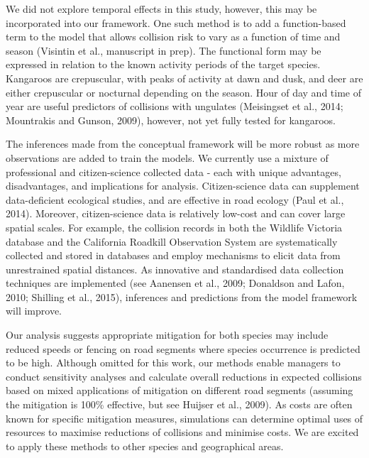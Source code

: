 We did not explore temporal effects in this study, however, this may be incorporated into our framework.  One such method is to add a function-based term to the model that allows collision risk to vary as a function of time and season (Visintin et al., manuscript in prep). The functional form may be expressed in relation to the known activity periods of the target species. Kangaroos are crepuscular, with peaks of activity at dawn and dusk, and deer are either crepuscular or nocturnal depending on the season.  Hour of day and time of year are useful predictors of collisions with ungulates (Meisingset et al., 2014; Mountrakis and Gunson, 2009), however, not yet fully tested for kangaroos.

The inferences made from the conceptual framework will be more robust as more observations are added to train the models.  We currently use a mixture of professional and citizen-science collected data - each with unique advantages, disadvantages, and implications for analysis.  Citizen-science data can supplement data-deficient ecological studies, and are effective in road ecology (Paul et al., 2014).  Moreover, citizen-science data is relatively low-cost and can cover large spatial scales.  For example, the collision records in both the Wildlife Victoria database and the California Roadkill Observation System are systematically collected and stored in databases and employ mechanisms to elicit data from unrestrained spatial distances.  As innovative and standardised data collection techniques are implemented (see Aanensen et al., 2009; Donaldson and Lafon, 2010; Shilling et al., 2015), inferences and predictions from the model framework will improve.

Our analysis suggests appropriate mitigation for both species may include reduced speeds or fencing on road segments where species occurrence is predicted to be high.  Although omitted for this work, our methods enable managers to conduct sensitivity analyses and calculate overall reductions in expected collisions based on mixed applications of mitigation on different road segments (assuming the mitigation is 100\% effective, but see Huijser et al., 2009).  As costs are often known for specific mitigation measures, simulations can determine optimal uses of resources to maximise reductions of collisions and minimise costs. We are excited to apply these methods to other species and geographical areas.